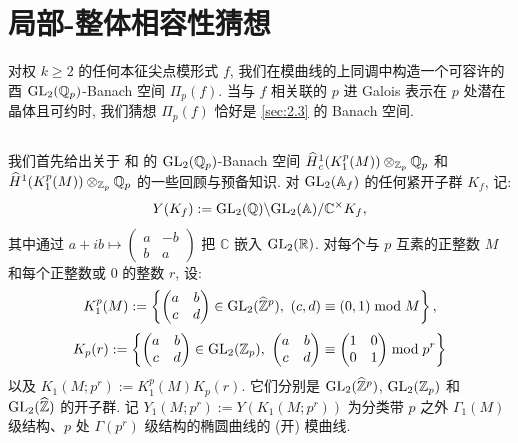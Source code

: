 
\section{局部-整体相容性猜想}

对权 $k \ge 2$ 的任何本征尖点模形式 $f$, 我们在模曲线的上同调中构造一个可容许的酉 $\mathrm{GL}_2(\mathbb{Q}_p)$-Banach 空间 $\Pi_p(f)$.
当与 $f$ 相关联的 $p$ 进 Galois 表示在 $p$ 处潜在晶体且可约时, 我们猜想 $\Pi_p(f)$ 恰好是 \ref{sec:2.3} 的 Banach 空间.

\subsection{\mbox{}}\label{sec:3.1}

我们首先给出关于 \cite{ref:24} 和 \cite{ref:9} 的 $\mathrm{GL}_2(\mathbb{Q}_p)$-Banach 空间 $\widehat{H}{}_{c}^{1}(K_1^{p}(M)) \otimes_{\mathbb{Z}_p} \mathbb{Q}_p$ 和 $\widehat{H}{}^{1}(K_1^{p}(M)) \otimes_{\mathbb{Z}_p} \mathbb{Q}_p$ 的一些回顾与预备知识.
对 $\mathrm{GL}_2(\mathbb{A}_f)$ 的任何紧开子群 $K_f$, 记:
\[
Y(K_f) := \mathrm{GL}_2(\mathbb{Q})\backslash \mathrm{GL}_2(\mathbb{A})/\mathbb{C}^{\times}K_f,
\]
其中通过 $a + ib \mapsto \begin{pmatrix} a & -b \\ b & a \end{pmatrix}$ 把 $\mathbb{C}$ 嵌入 $\mathrm{GL}_2(\mathbb{R})$.
对每个与 $p$ 互素的正整数 $M$ 和每个正整数或 $0$ 的整数 $r$, 设:
\[
K_1^{p}(M) := \left\{ \begin{pmatrix} a & b \\ c & d \end{pmatrix} \in \mathrm{GL}_2(\widehat{\mathbb{Z}}{}^{p}),\ (c,d) \equiv (0,1) \bmod M \right\},
\]
\[
K_p(r) := \left\{ \begin{pmatrix} a & b \\ c & d \end{pmatrix} \in \GL_2(\Zp),\ \begin{pmatrix} a & b \\ c & d \end{pmatrix} \equiv \begin{pmatrix} 1 & 0 \\ 0 & 1 \end{pmatrix} \bmod p^{r} \right\}
\]
以及 $K_1(M;p^{r}) := K_1^{p}(M)K_p(r)$.
它们分别是 $\mathrm{GL}_2(\widehat{\mathbb{Z}}{}^{p})$, $\mathrm{GL}_2(\mathbb{Z}_p)$ 和 $\mathrm{GL}_2(\widehat{\mathbb{Z}})$ 的开子群.
记 $Y_1(M;p^{r}) := Y(K_1(M;p^{r}))$ 为分类带 $p$ 之外 $\Gamma_1(M)$ 级结构、$p$ 处 $\Gamma(p^{r})$ 级结构的椭圆曲线的 (开) 模曲线.

